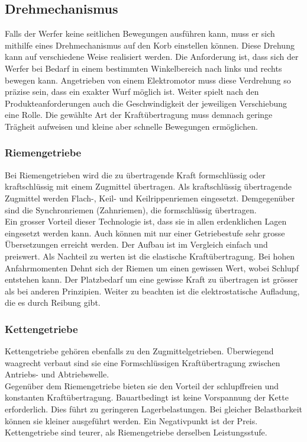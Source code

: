 \subsection{Drehmechanismus}
Falls der Werfer keine seitlichen Bewegungen ausführen kann, muss er sich mithilfe eines Drehmechanismus auf den Korb einstellen können. Diese Drehung kann auf verschiedene Weise realisiert werden. Die Anforderung ist, dass sich der Werfer bei Bedarf in einem bestimmten Winkelbereich nach links und rechts bewegen kann. Angetrieben von einem Elektromotor muss diese Verdrehung so präzise sein, dass ein exakter Wurf möglich ist. Weiter spielt nach den Produkteanforderungen auch die Geschwindigkeit der jeweiligen Verschiebung eine Rolle. Die gewählte Art der Kraftübertragung muss demnach geringe Trägheit aufweisen und kleine aber schnelle Bewegungen ermöglichen. 
 
\subsubsection{Riemengetriebe}
Bei Riemengetrieben wird die zu übertragende Kraft formschlüssig oder kraftschlüssig mit einem Zugmittel übertragen. Als kraftschlüssig übertragende Zugmittel werden Flach-, Keil- und Keilrippenriemen eingesetzt. Demgegenüber sind die Synchronriemen (Zahnriemen), die formschlüssig übertragen. \\
Ein grosser Vorteil dieser Technologie ist, dass sie in allen erdenklichen Lagen eingesetzt werden kann. Auch können mit nur einer Getriebestufe sehr grosse Übersetzungen erreicht werden. Der Aufbau ist im Vergleich einfach und preiswert. Als Nachteil zu werten ist die elastische Kraftübertragung. Bei hohen Anfahrmomenten Dehnt sich der Riemen um einen gewissen Wert, wobei Schlupf entstehen kann. Der Platzbedarf um eine gewisse Kraft zu übertragen ist grösser als bei anderen Prinzipien. Weiter zu beachten ist die elektrostatische Aufladung, die es durch Reibung gibt. 
 
\subsubsection{Kettengetriebe}
Kettengetriebe gehören ebenfalls zu den Zugmittelgetrieben. Überwiegend waagrecht verbaut sind sie eine Formschlüssigen Kraftübertragung zwischen Antriebs- und Abtriebswelle. \\
Gegenüber dem Riemengetriebe bieten sie den Vorteil der schlupffreien und konstanten Kraftübertragung. Bauartbedingt ist keine Vorspannung der Kette erforderlich. Dies führt zu geringeren Lagerbelastungen. Bei gleicher Belastbarkeit können sie kleiner ausgeführt werden. Ein Negativpunkt ist der Preis. Kettengetriebe sind teurer, als Riemengetriebe derselben Leistungsstufe.

